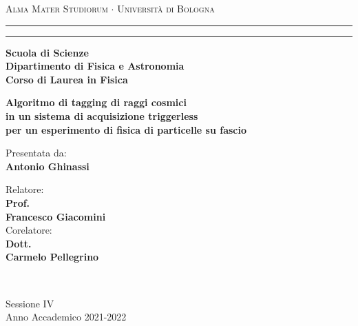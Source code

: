 \documentclass[../main.tex]{subfiles}
\begin{document}
\begin{titlepage}
    \begin{center}
        {{\Large{\textsc{Alma Mater Studiorum $\cdot$ Università di
                            Bologna}}}} \rule[0.1cm]{15.8cm}{0.1mm}
        \rule[0.5cm]{15.8cm}{0.6mm}
        {\small{\bf         Scuola di Scienze \\
                Dipartimento di Fisica e Astronomia\\
                Corso di Laurea in Fisica }}
    \end{center}
    \vspace{15mm}
    \begin{center}
        \vspace{3cm}
        \Large
        {\textbf{Algoritmo di tagging di raggi cosmici \\ in un sistema di acquisizione triggerless \\ per un esperimento di fisica di particelle su fascio}}
        \vspace{1cm}
    \end{center}
    \vspace{20mm}
    \par
    \noindent

    \vspace{8mm}
    \begin{minipage}[t]{0.34\textwidth}
        \begin{flushleft}
            {Presentata da: \\ \textbf{Antonio Ghinassi}}
        \end{flushleft}
    \end{minipage}
    \begin{minipage}[t]{0.64\textwidth}
        \begin{flushright}
            Relatore: \\
            \textbf{Prof.} \\
            \textbf{Francesco Giacomini} \\
            \vspace{0.5 cm}
            Corelatore: \\
            \textbf{Dott.}
            \\ \textbf{Carmelo Pellegrino}
        \end{flushright}
    \end{minipage}\\

    \vspace*{\fill}
    \begin{center}
        {\large{ Sessione IV\\
                Anno Accademico 2021-2022}}
    \end{center}
\end{titlepage}
\end{document}
